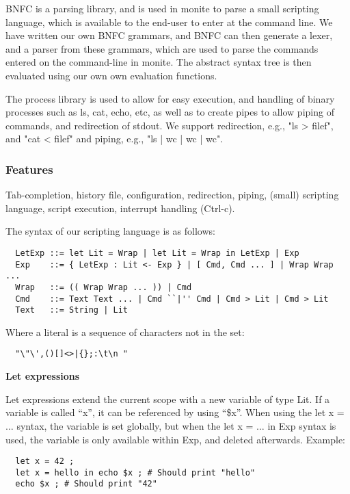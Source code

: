 \documentclass[11pt,a4paper]{article}
\begin{document}
BNFC is a parsing library, and is used in monite to parse a small scripting
language, which is available to the end-user to enter at the command line. We
have written our own BNFC grammars, and BNFC can then generate a lexer, and a
parser from these grammars, which are used to parse the commands entered on the
command-line in monite. The abstract syntax tree is then evaluated using our own
own evaluation functions.

The process library is used to allow for easy execution, and handling of binary
processes such as ls, cat, echo, etc, as well as to create pipes to allow
piping of commands, and redirection of stdout. We support redirection, e.g.,
"ls > filef", and "cat < filef" and piping, e.g., "ls | wc | wc | wc".

\subsubsection{Features}
\label{features}
Tab-completion, history file, configuration, redirection, piping, (small)
scripting language, script execution, interrupt handling (Ctrl-c).

The syntax of our scripting language is as follows:

\begin{verbatim}
  LetExp ::= let Lit = Wrap | let Lit = Wrap in LetExp | Exp
  Exp    ::= { LetExp : Lit <- Exp } | [ Cmd, Cmd ... ] | Wrap Wrap ...
  Wrap   ::= (( Wrap Wrap ... )) | Cmd
  Cmd    ::= Text Text ... | Cmd ``|'' Cmd | Cmd > Lit | Cmd > Lit
  Text   ::= String | Lit
\end{verbatim}

Where a literal is a sequence of characters not in the set:
\begin{verbatim}
  "\"\',()[]<>|{};:\t\n "
\end{verbatim}

\textbf{Let expressions}

Let expressions extend the current scope with a new variable of type Lit. If a
variable is called ``x'', it can be referenced by using ``\$x''.  When using the
let x = $\dots$ syntax, the variable is set globally, but when the let x =
$\dots$ in Exp syntax is used, the variable is only available within Exp, and
deleted afterwards. Example:

\begin{verbatim}
  let x = 42 ;
  let x = hello in echo $x ; # Should print "hello"
  echo $x ; # Should print "42"
\end{verbatim}
\end{document}
